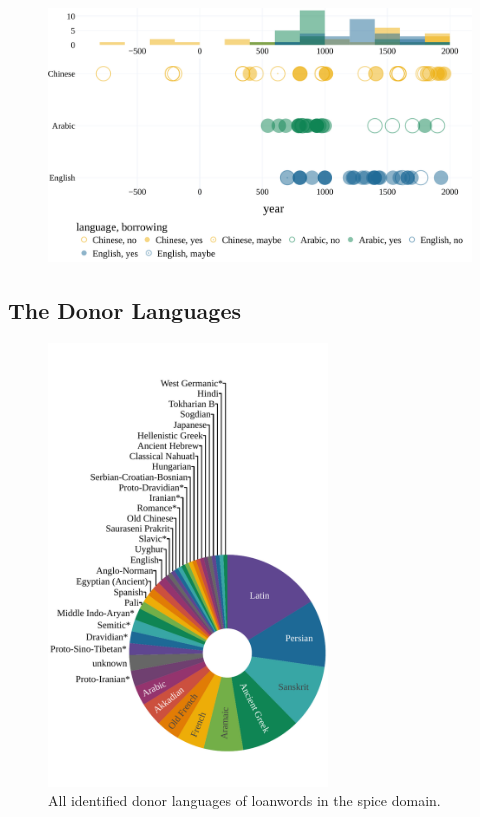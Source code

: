 \begin{figure}[!ht]
  \centering
  \includegraphics[width=\linewidth]{imgs/plots/attestation_and_borrowing_compact.pdf}
  \caption{}
  \label{fig:attestation_and_borrowing_compact}
\end{figure}

\subsection{The Donor Languages}

\begin{figure}
  \vspace{-\baselineskip}
  \includegraphics[width=0.66\textwidth]{imgs/plots/donors_pie.pdf}
  \caption{All identified donor languages of loanwords in the spice domain.}
  \label{fig:donor_pie}
\end{figure}

